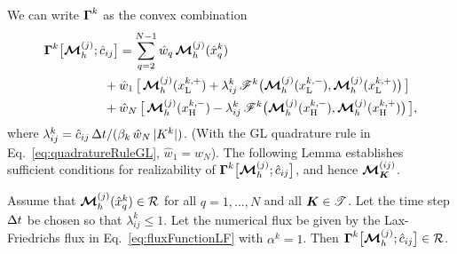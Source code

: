 We can write $\boldsymbol{\Gamma}^{k}$ as the convex combination
\begin{align}
  \vect{\Gamma}^{k}\big[\bcM_{h}^{(j)};\hat{c}_{ij}\big]
  &=\sum_{q=2}^{N-1}\hat{w}_{q}\,\vect{\cM}_{h}^{(j)}(\hat{x}_{q}^{k}) \nonumber \\
  &\hspace{-12pt}
  +\hat{w}_{1}\,\big[\,\vect{\cM}_{h}^{(j)}(x_{\Low}^{k,+})+\lambda_{ij}^{k}\,\mathscr{F}^{k}\big(\vect{\cM}_{h}^{(j)}(x_{\Low}^{k,-}),\vect{\cM}_{h}^{(j)}(x_{\Low}^{k,+})\big)\,\big] \nonumber \\
  &\hspace{-12pt}
  +\hat{w}_{N}\,\big[\,\vect{\cM}_{h}^{(j)}(x_{\Hgh}^{k,-})-\lambda_{ij}^{k}\,\mathscr{F}^{k}\big(\vect{\cM}_{h}^{(j)}(x_{\Hgh}^{k,-}),\vect{\cM}_{h}^{(j)}(x_{\Hgh}^{k,+})\big)\,\big],
  \label{eq:realizableGammaConvex}
\end{align}
where $\lambda_{ij}^{k}=\hat{c}_{ij}\,\Delta t/(\beta_{k}\,\hat{w}_{N}\,|K^{k}|)$.  
(With the GL quadrature rule in Eq.~\eqref{eq:quadratureRuleGL}, $\hat{w}_{1}=\hat{w}_{N}$).  
The following Lemma establishes sufficient conditions for realizability of $\boldsymbol{\Gamma}^{k}\big[\boldsymbol{\mathcal{M}}_{h}^{(j)};\hat{c}_{ij}\big]$, and hence $\boldsymbol{\mathcal{M}}_{\boldsymbol{K}}^{(ij)}$.  
\begin{lemma}
  Assume that $\boldsymbol{\mathcal{M}}_{h}^{(j)}(\hat{x}_{q}^{k})\in\mathcal{R}$ for all $q=1,\ldots,N$ and all $\boldsymbol{K}\in\mathscr{T}$.  
  Let the time step $\Delta t$ be chosen so that $\lambda_{ij}^{k}\le1$.  
  Let the numerical flux be given by the Lax-Friedrichs flux in Eq.~\eqref{eq:fluxFunctionLF} with $\alpha^{k}=1$.  
  Then $\boldsymbol{\Gamma}^{k}\big[\boldsymbol{\mathcal{M}}_{h}^{(j)};\hat{c}_{ij}\big]\in\mathcal{R}$.  
  \label{lem:realizableGamma}
\end{lemma}
